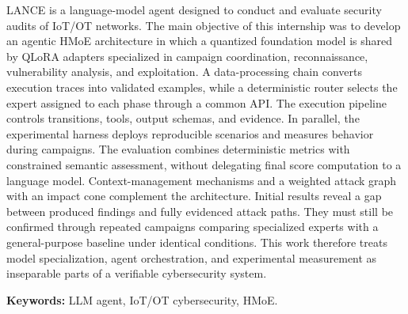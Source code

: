 LANCE is a language-model agent designed to conduct and evaluate security audits
of IoT/OT networks. The main objective of this internship was to develop an
agentic HMoE architecture in which a quantized foundation model is shared by
QLoRA adapters specialized in campaign coordination, reconnaissance,
vulnerability analysis, and exploitation. A data-processing chain converts
execution traces into validated examples, while a deterministic router selects
the expert assigned to each phase through a common API. The execution pipeline
controls transitions, tools, output schemas, and evidence. In parallel, the
experimental harness deploys reproducible scenarios and measures behavior during
campaigns. The evaluation combines deterministic metrics with constrained
semantic assessment, without delegating final score computation to a language
model. Context-management mechanisms and a weighted attack graph with an impact
cone complement the architecture. Initial results reveal a gap between produced
findings and fully evidenced attack paths. They must still be confirmed through
repeated campaigns comparing specialized experts with a general-purpose
baseline under identical conditions. This work therefore treats model
specialization, agent orchestration, and experimental measurement as inseparable
parts of a verifiable cybersecurity system.

\vspace{1em}
\noindent\textbf{Keywords:} LLM agent, IoT/OT cybersecurity, HMoE.

